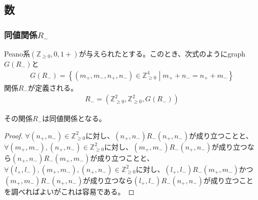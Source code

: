 \documentclass[dvipdfmx]{jsarticle}
\begin{document}
\subsection{数}%
\subsubsection{同値関係$R_{-}$}%
\begin{dfn}
Peano系$\left( \mathbb{Z}_{\geq 0},0,1 + \right)$が与えられたとする。このとき、次式のようにgraph$G\left( R_{-} \right)$と
\begin{align*}
G\left( R_{-} \right) = \left\{ \left( m_{+},m_{-},n_{+},n_{-} \right) \in \mathbb{Z}_{\geq 0}^{4} \middle| m_{+} + n_{-} = n_{+} + m_{-} \right\}
\end{align*}
関係$R_{-}$が定義される。
\begin{align*}
R_{-} = \left( \mathbb{Z}_{\geq 0}^{2},\mathbb{Z}_{\geq 0}^{2},G\left( R_{-} \right) \right)
\end{align*}
\end{dfn}
\begin{thm}\label{1.2.6.1}
その関係$R_{-}$は同値関係となる。
\end{thm}
\begin{proof}
$\forall\left( n_{+},n_{-} \right) \in \mathbb{Z}_{\geq 0}^{2}$に対し、$\left( n_{+},n_{-} \right)R_{-}\left( n_{+},n_{-} \right)$が成り立つことと、$\forall\left( m_{+},m_{-} \right),\left( n_{+},n_{-} \right) \in \mathbb{Z}_{\geq 0}^{2}$に対し、$\left( m_{+},m_{-} \right)R_{-}\left( n_{+},n_{-} \right)$が成り立つなら$\left( n_{+},n_{-} \right)R_{-}\left( m_{+},m_{-} \right)$が成り立つことと、$\forall\left( l_{+},l_{-} \right),\left( m_{+},m_{-} \right),\left( n_{+},n_{-} \right) \in \mathbb{Z}_{\geq 0}^{2}$に対し、$\left( l_{+},l_{-} \right)R_{-}\left( m_{+},m_{-} \right)$かつ$\left( m_{+},m_{-} \right)R_{-}\left( n_{+},n_{-} \right)$が成り立つなら$\left( l_{+},l_{-} \right)R_{-}\left( n_{+},n_{-} \right)$が成り立つことを調べればよいがこれは容易である。
\end{proof}
\end{document}
